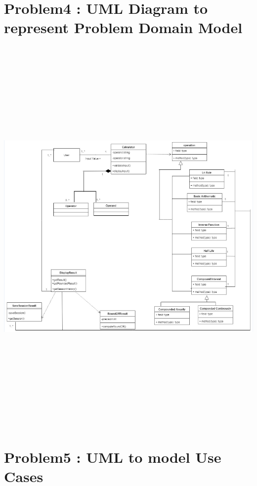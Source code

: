 \documentclass[12pt]{article}
\begin{document}
\section{Problem4 : UML Diagram to represent Problem Domain Model}
	\includegraphics[width=6.5in,height=8in]{./Problem4_UML.png}
\section{Problem5 : UML to model Use Cases}
\end{document}
